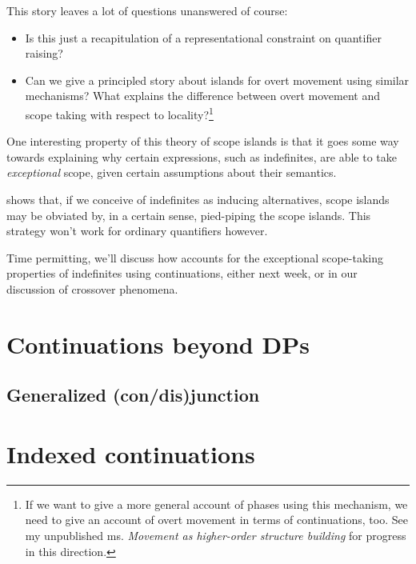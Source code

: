 \documentclass[nols,twoside,nofonts,nobib,nohyper]{tufte-handout}
\begin{document}
This story leaves a lot of questions unanswered of course:

\begin{itemize}

    \item Is this just a recapitulation of a representational constraint on
    quantifier raising?

    \item Can we give a principled story about islands for overt movement using
    similar mechanisms? What explains the difference between overt movement and
    scope taking with respect to locality?\footnote{If we want to give a more
    general account of phases using this mechanism, we need to give an account
    of overt movement in terms of continuations, too. See my unpublished ms.
    \textit{Movement as higher-order structure building} for progress in this direction.}

\end{itemize}

One interesting property of this theory of scope islands is that it goes
some way towards explaining why certain expressions, such as indefinites, are able to take
\textit{exceptional} scope, given certain assumptions about their semantics.

\citet{Charlowc} shows that, if we conceive of indefinites as inducing
alternatives, scope islands may be obviated by, in a certain sense, pied-piping
the scope islands. This strategy won't work for ordinary quantifiers
however.

Time permitting, we'll discuss how \citeauthor{Charlowc} accounts for the
exceptional scope-taking properties of indefinites using continuations, either
next week, or in our discussion of crossover phenomena.

\section{Continuations beyond DPs}

\subsection{Generalized (con/dis)junction}\label{sec:conj}

\section{Indexed continuations}
\end{document}
